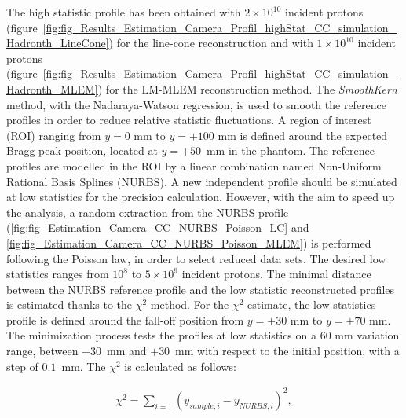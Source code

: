 The high statistic profile has been obtained with $2\times10^{10}$ incident protons (figure~\ref{fig:fig_Results_Estimation_Camera_Profil_highStat_CC_simulation_Hadronth_LineCone}) for the line-cone reconstruction and with $1\times10^{10}$ incident protons (figure~\ref{fig:fig_Results_Estimation_Camera_Profil_highStat_CC_simulation_Hadronth_MLEM}) for the LM-MLEM reconstruction method. The \textit{SmoothKern} method, with the Nadaraya-Watson regression, is used to smooth the reference profiles in order to reduce relative statistic fluctuations.\newline
A region of interest (ROI) ranging from $y=0$ mm to $y=+100$ mm is defined around the expected Bragg peak position, located at $y=+50$~mm in the phantom. The reference profiles are modelled in the ROI by a linear combination named Non-Uniform Rational Basis Splines (NURBS). \newline
A new independent profile should be simulated at low statistics for the precision calculation. However, with the aim to speed up the analysis, a random extraction from the NURBS profile (\ref {fig:fig_Estimation_Camera_CC_NURBS_Poisson_LC} and \ref {fig:fig_Estimation_Camera_CC_NURBS_Poisson_MLEM}) is performed following the Poisson law, in order to select reduced data sets. The desired low statistics ranges from $10^8$ to $5\times10^9$ incident protons.\newline
The minimal distance between the NURBS reference profile and the low statistic reconstructed profiles is estimated thanks to the $\chi^2$ method. For the $\chi^2$ estimate, the low statistics profile is defined around the fall-off position from $y=+30$ mm to $y=+70$ mm. The minimization process tests the profiles at low statistics on a 60 mm variation range, between $-30$~mm and $+30$~mm with respect to the initial position, with a step of $0.1$~mm. The      $\chi^2$ is calculated as follows:

\begin{eqnarray}
\chi^2 = \sum\limits_{i=1} {(y_{sample,i}-y_{NURBS,i})^2},
\end{eqnarray}

